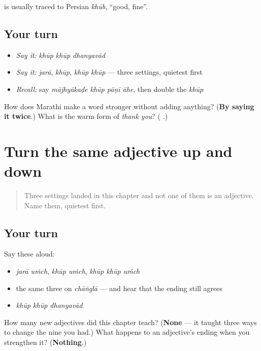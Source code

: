 \begin{cousinweb}
\textbf{} is usually traced to Persian \emph{khūb}, \textquotedblleft{}good, fine\textquotedblright{}.
\end{cousinweb}

\subsection*{Your turn}
\begin{itemize}
\raggedright
  \item \emph{Say it:} \emph{khūp khūp dhanyavād}
  \item \emph{Say it:} \emph{jarā}, \emph{khūp}, \emph{khūp khūp} — three settings, quietest first
  \item \emph{Recall:} say \emph{mājhyākaḍe khūp pāṇī āhe}, then double the \emph{khūp}
\end{itemize}

\begin{tcolorbox}[breakable,colback=teal!4,colframe=teal!35!black,title={Before you move on}]
How does Marathi make a word stronger without adding anything? (\textbf{By saying it twice}.) What is the warm form of \emph{thank you}? (\textbf{  }.)
\end{tcolorbox}
\section[\texorpdfstring{\mr{जरा} · \mr{खूप} · \mr{खूप} \mr{खूप} (jarā · khūp …)}{जरा · खूप · खूप खूप (jarā · khūp …)}]{Turn the same adjective up and down}

\label{lesson:MR-R53-very}



\begin{quote}
Three settings landed in this chapter and not one of them is an adjective. Name them, quietest first.
\end{quote}

\subsection*{Your turn}
Say these aloud:

\begin{itemize}
\raggedright
  \item \emph{jarā uṁch}, \emph{khūp uṁch}, \emph{khūp khūp uṁch}
  \item the same three on \emph{chāṅglā} — and hear that the ending still agrees
  \item \emph{khūp khūp dhanyavād}
\end{itemize}

\begin{tcolorbox}[breakable,colback=teal!4,colframe=teal!35!black,title={Before you move on}]
How many new adjectives did this chapter teach? (\textbf{None} — it taught three ways to change the nine you had.) What happens to an adjective's ending when you strengthen it? (\textbf{Nothing}.)
\end{tcolorbox}
